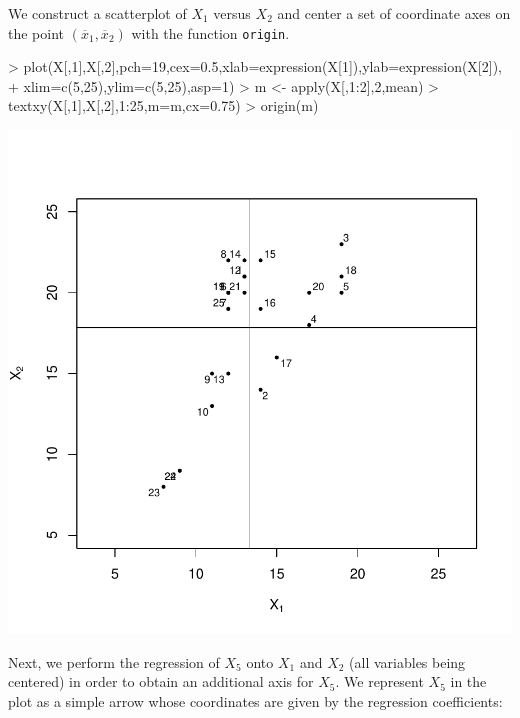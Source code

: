 \documentclass[a4paper]{article}
\begin{document}
We construct a scatterplot of $X_1$ versus $X_2$ and center a set of coordinate 
axes on the point $(\overline{x}_1,\overline{x}_2)$ with the function {\tt origin}.


\begin{Schunk}
\begin{Sinput}
> plot(X[,1],X[,2],pch=19,cex=0.5,xlab=expression(X[1]),ylab=expression(X[2]),
+      xlim=c(5,25),ylim=c(5,25),asp=1)
> m <- apply(X[,1:2],2,mean)
> textxy(X[,1],X[,2],1:25,m=m,cx=0.75)
> origin(m)
\end{Sinput}
\end{Schunk}
\includegraphics{CalibrationGuide-004}

Next, we perform the regression of $X_5$ onto $X_1$ and $X_2$ (all variables being centered) in order to 
obtain an additional axis for $X_5$. We represent $X_5$ in the plot as a simple 
arrow whose coordinates are given by the regression coefficients:
\end{document}
